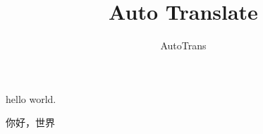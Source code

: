 \documentclass[11pt]{article}
\title{\textbf{Auto Translate}}
\author{AutoTrans}
\date{}
\begin{document}
hello world.

你好，世界
\end{document}
